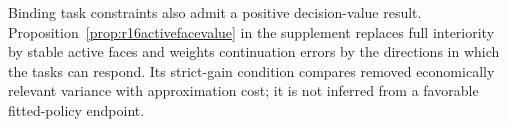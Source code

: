 Binding task constraints also admit a positive decision-value result. Proposition~\ref{prop:r16activefacevalue} in the supplement replaces full interiority by stable active faces and weights continuation errors by the directions in which the tasks can respond. Its strict-gain condition compares removed economically relevant variance with approximation cost; it is not inferred from a favorable fitted-policy endpoint.
